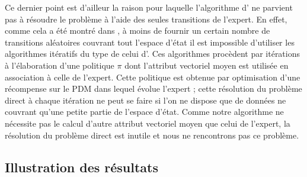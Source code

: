 \documentclass[publibook-draft]{CAp2012}
\begin{document}
 Ce dernier point est d'ailleur la raison pour laquelle l'algorithme d'\citet{abbeel2004apprenticeship} ne parvient pas à résoudre le problème à l'aide des seules transitions de l'expert.
En effet, comme cela a été montré dans \citep{klein2011batch}, à moins de fournir un certain nombre de transitions aléatoires couvrant tout l'espace d'état il est impossible d'utiliser les algorithmes itératifs du type de celui d'\citet{abbeel2004apprenticeship}. Ces algorithmes procèdent par itérations à l'élaboration d'une politique $\pi$ dont l'attribut vectoriel moyen est utilisée en association à celle de l'expert. Cette politique est obtenue par optimisation d'une récompense sur le PDM dans lequel évolue l'expert ; cette résolution du problème direct à chaque itération ne peut se faire si l'on ne dispose que de données ne couvrant qu'une petite partie de l'espace d'état. Comme notre algorithme ne nécessite pas le calcul d'autre attribut vectoriel moyen que celui de l'expert, la résolution du problème direct est inutile et nous ne rencontrons pas ce problème.
\subsection{Illustration des résultats}
\end{document}
